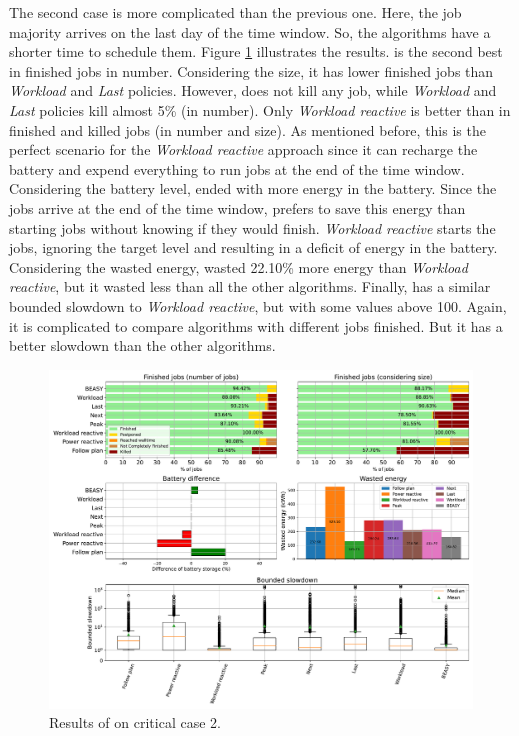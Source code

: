 The second case is more complicated than the previous one. Here, the job majority arrives on the last day of the time window. So, the algorithms have a shorter time to schedule them. Figure \ref{fig:beasy_critical_2} illustrates the results. \emph{\systemName} is the second best in finished jobs in number. Considering the size, it has lower finished jobs than \emph{Workload} and \emph{Last} policies. However, \emph{\systemName} does not kill any job, while \emph{Workload} and \emph{Last} policies kill almost 5\% (in number). Only \emph{Workload reactive} is better than \emph{\systemName} in finished and killed jobs (in number and size). As mentioned before, this is the perfect scenario for the \emph{Workload reactive} approach since it can recharge the battery and expend everything to run jobs at the end of the time window. Considering the battery level, \emph{\systemName} ended with more energy in the battery. Since the jobs arrive at the end of the time window, \emph{\systemName} prefers to save this energy than starting jobs without knowing if they would finish. \emph{Workload reactive} starts the jobs, ignoring the target level and resulting in a deficit of energy in the battery. Considering the wasted energy, \emph{\systemName} wasted 22.10\% more energy than \emph{Workload reactive}, but it wasted less than all the other algorithms. Finally, \emph{\systemName} has a similar bounded slowdown to \emph{Workload reactive}, but with some values above 100. Again, it is complicated to compare algorithms with different jobs finished. But it has a better slowdown than the other algorithms.
 
\begin{figure}[!htb]
    \centering
    \includegraphics[scale=0.39]{Images/Heuristic/profile_best_workload_2_with_noise.pdf}
    \caption{Results of \emph{\systemName} on critical case 2.}
    \label{fig:beasy_critical_2}
\end{figure}

